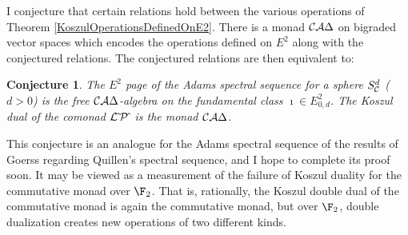 \documentclass[11pt]{article}
\theoremstyle{plain}
\newtheorem{conjectureAlpha}{Conjecture}
\newcommand{\Sq}{\mathrm{Sq}}
\begin{document}
I conjecture that certain relations hold between the various operations of Theorem \ref{KoszulOperationsDefinedOnE2}. There is a monad $\mathcal{C}\mathcal{A}\Delta$ on bigraded vector spaces which encodes the operations defined on $E^2$ along with the conjectured relations. The conjectured relations are then equivalent to:
\begin{conjectureAlpha}\label{E2monadConjecture}
The $E^2$ page of the Adams spectral sequence for a sphere $S^d_{\mathcal{C}}$ ($d>0$) is the free $\mathcal{C}\mathcal{A}\Delta$-algebra on the fundamental class $\imath\in E^2_{0,d}$. The Koszul dual of the comonad $\mathcal{L}\hat{\,}\mathcal{P}\hat{\,}$ is the monad $\mathcal{C}\mathcal{A}\Delta$.
\end{conjectureAlpha}
\noindent This conjecture is an analogue for the Adams spectral sequence of the results of Goerss \cite[{6.2}, {6.5}]{MR1089001} regarding Quillen's spectral sequence, and I hope to complete its proof soon. %
%
%
It may be viewed as a measurement of the failure of Koszul duality for the commutative monad over $\F_2$. That is, rationally, the Koszul double dual of the commutative monad is again the commutative monad, but over $\F_2$, double dualization creates new operations of two different kinds.
\end{document}
